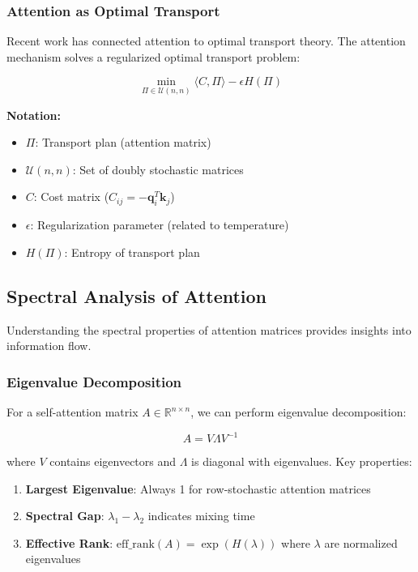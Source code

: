\subsubsection{Attention as Optimal Transport}

Recent work has connected attention to optimal transport theory. The attention mechanism solves a regularized optimal transport problem:

\begin{equation}
\min_{\Pi \in \mathcal{U}(n,n)} \langle C, \Pi \rangle - \epsilon H(\Pi)
\end{equation}

\begin{notationbox}
\textbf{Notation:}
\begin{itemize}
    \item $\Pi$: Transport plan (attention matrix)
    \item $\mathcal{U}(n,n)$: Set of doubly stochastic matrices
    \item $C$: Cost matrix ($C_{ij} = -\mathbf{q}_i^T \mathbf{k}_j$)
    \item $\epsilon$: Regularization parameter (related to temperature)
    \item $H(\Pi)$: Entropy of transport plan
\end{itemize}
\end{notationbox}

\subsection{Spectral Analysis of Attention}

Understanding the spectral properties of attention matrices provides insights into information flow.

\subsubsection{Eigenvalue Decomposition}

For a self-attention matrix $A \in \mathbb{R}^{n \times n}$, we can perform eigenvalue decomposition:

\begin{equation}
A = V \Lambda V^{-1}
\end{equation}

where $V$ contains eigenvectors and $\Lambda$ is diagonal with eigenvalues. Key properties:

\begin{enumerate}
    \item \textbf{Largest Eigenvalue}: Always 1 for row-stochastic attention matrices
    \item \textbf{Spectral Gap}: $\lambda_1 - \lambda_2$ indicates mixing time
    \item \textbf{Effective Rank}: $\text{eff\_rank}(A) = \exp(H(\lambda))$ where $\lambda$ are normalized eigenvalues
\end{enumerate}

